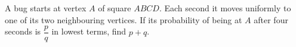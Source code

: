A bug starts at vertex $A$ of square $ABCD$. Each second it moves uniformly to one of its two neighbouring vertices. If its probability of being at $A$ after four seconds is $\dfrac{p}{q}$ in lowest terms, find $p+q$.
